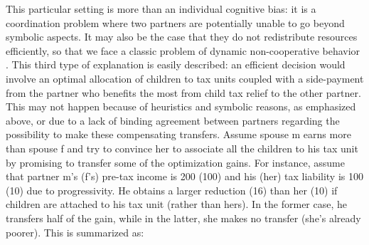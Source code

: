 \medskip

This particular setting is more than an individual cognitive bias: it is a coordination problem where two partners are potentially unable to go beyond symbolic aspects. It may also be the case that they do not redistribute resources efficiently, so that we face a classic problem of dynamic non-cooperative behavior \citep{chiappori2017static}. This third type of explanation is easily described: an efficient decision would involve an optimal allocation of children to tax units coupled with a side-payment from the partner who benefits the most from child tax relief to the other partner. This may not happen because of heuristics and symbolic reasons, as emphasized above, or due to a lack of binding agreement between partners regarding the possibility to make these compensating transfers. Assume spouse m earns more than spouse f and try to convince her to associate all the children to his tax unit by promising to transfer some of the optimization gains. For instance, assume that partner m’s (f’s) pre-tax income is 200 (100) and his (her) tax liability is 100 (10) due to progressivity. He obtains a larger reduction (16) than her (10) if children are attached to his tax unit (rather than hers). In the former case, he transfers half of the gain, while in the latter, she makes no transfer (she’s already poorer). This is summarized as:

  \begin{table}[H]
  \end{table}

